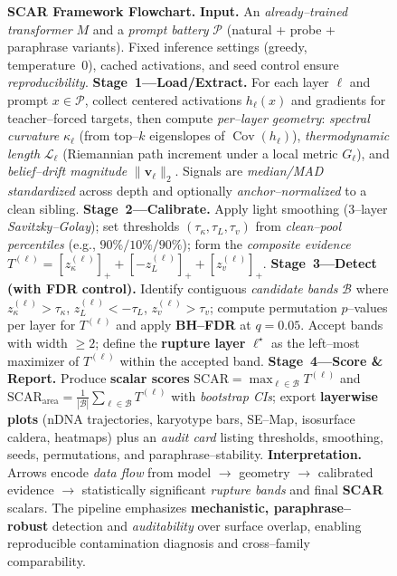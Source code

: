 \documentclass[11pt]{article}
\begin{document}
\begin{figure}[t]
\caption{\textbf{SCAR Framework Flowchart.}
\textbf{Input.} An \emph{already–trained transformer} $M$ and a \emph{prompt battery} $\mathcal{P}$ (natural + probe + paraphrase variants). Fixed inference settings (greedy, temperature~0), cached activations, and seed control ensure \emph{reproducibility}. 
\textbf{Stage~1—Load/Extract.} For each layer $\ell$ and prompt $x\!\in\!\mathcal{P}$, collect centered activations $h_\ell(x)$ and gradients for teacher–forced targets, then compute \emph{per–layer geometry}: \emph{spectral curvature} $\kappa_\ell$ (from top–$k$ eigenslopes of $\operatorname{Cov}(h_\ell)$), \emph{thermodynamic length} $\mathcal{L}_\ell$ (Riemannian path increment under a local metric $G_\ell$), and \emph{belief–drift magnitude} $\|\mathbf{v}_\ell\|_2$. Signals are \emph{median/MAD standardized} across depth and optionally \emph{anchor–normalized} to a clean sibling. 
\textbf{Stage~2—Calibrate.} Apply light smoothing (3–layer \emph{Savitzky–Golay}); set thresholds $(\tau_\kappa,\tau_L,\tau_v)$ from \emph{clean–pool percentiles} (e.g., $90\%/10\%/90\%$); form the \emph{composite evidence}
$T^{(\ell)}=[z_\kappa^{(\ell)}]_+ + [-z_L^{(\ell)}]_+ + [z_v^{(\ell)}]_+$.
\textbf{Stage~3—Detect (with FDR control).} Identify contiguous \emph{candidate bands} $\mathcal{B}$ where $z_\kappa^{(\ell)}{>}\tau_\kappa$, $z_L^{(\ell)}{<}{-}\tau_L$, $z_v^{(\ell)}{>}\tau_v$; compute permutation $p$–values per layer for $T^{(\ell)}$ and apply \textbf{BH–FDR} at $q{=}0.05$. Accept bands with width $\ge2$; define the \textbf{rupture layer} $\ell^\star$ as the left–most maximizer of $T^{(\ell)}$ within the accepted band. 
\textbf{Stage~4—Score \& Report.} Produce \textbf{scalar scores} $\mathrm{SCAR}=\max_{\ell\in\mathcal{B}}T^{(\ell)}$ and $\mathrm{SCAR}_{\mathrm{area}}=\frac{1}{|\mathcal{B}|}\sum_{\ell\in\mathcal{B}}T^{(\ell)}$ with \emph{bootstrap CIs}; export \textbf{layerwise plots} (nDNA trajectories, karyotype bars, SE–Map, isosurface caldera, heatmaps) plus an \emph{audit card} listing thresholds, smoothing, seeds, permutations, and paraphrase–stability. 
\textbf{Interpretation.} Arrows encode \emph{data flow} from model $\rightarrow$ geometry $\rightarrow$ calibrated evidence $\rightarrow$ statistically significant \emph{rupture bands} and final \textbf{SCAR} scalars. The pipeline emphasizes \textbf{mechanistic, paraphrase–robust} detection and \emph{auditability} over surface overlap, enabling reproducible contamination diagnosis and cross–family comparability.
}
\label{fig:scar-flowchart}
\end{figure}
\end{document}
